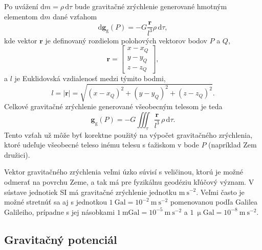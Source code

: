 \documentclass[a4paper, 12pt]{book}
\newcommand{\diff}{\mathrm d}
\newcommand{\gidx}{\mathrm g}
\let\vec\mathbf
\begin{document}
Po uvážení $\diff m = \rho \, \diff \tau$ bude gravitačné zrýchlenie generované 
hmotným elementom $\diff m$ dané vzťahom
%
\begin{equation}
\diff \vec g_\gidx(P) = -G \frac{\vec r}{l^3} \rho \, \diff\tau{,}
\end{equation}
%
kde vektor $\vec r$ je definovaný rozdielom polohových vektorov bodov $P$ 
a $Q$,
%
\begin{equation}
\label{eq:r}
\vec r = 
%
\begin{bmatrix}
x - x_Q \\
y - y_Q \\
z - z_Q
\end{bmatrix}
{,}
\end{equation}
%
a $l$ je Euklidovská vzdialenosť medzi týmito bodmi,
%
\begin{equation}
\label{eq:l}
l = | \vec r | = \sqrt{(x - x_Q)^2 + (y - y_Q)^2 + (z - z_Q)^2}{.}
\end{equation}
%
Celkové gravitačné zrýchlenie generované všeobecným telesom je teda
%
\begin{equation}
\label{eq:gg_body}
\vec g_\gidx(P) = -G \iiint_{\tau} \frac{\vec r}{l^3} \, \rho \, \diff\tau{.}
\end{equation}
%
Tento vzťah už môže byť korektne použitý na výpočet gravitačného zrýchlenia, 
ktoré udeľuje všeobecné teleso inému telesu s ťažiskom v bode $P$ (napríklad 
Zem družici).

Vektor gravitačného zrýchlenia veľmi úzko súvisí s veličinou, ktorú je možné 
odmerať na povrchu Zeme, a tak má pre fyzikálnu geodéziu kľúčový význam.  
V sústave jednotiek SI má gravitačné zrýchlenie jednotku $\mathrm{m}\ 
\mathrm{s}^{-2}$.  Veľmi často je možné stretnúť sa aj s jednotkou $1\ 
\mathrm{Gal} = 10^{-2}\ \mathrm{m}\ \mathrm{s}^{-2}$ pomenovanou podľa Galilea 
Galileiho, prípadne s jej násobkami $1\ \mathrm{mGal} = 10^{-5}\ \mathrm{m}\ 
\mathrm{s}^{-2}$ a $1\ \upmu \mathrm{Gal} = 10^{-8}\ \mathrm{m}\ 
\mathrm{s}^{-2}$.






\subsection{Gravitačný potenciál}
\label{sec:vg}
\end{document}
